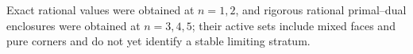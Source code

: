 Exact rational values were obtained at \(n=1,2\), and rigorous rational primal--dual enclosures were obtained at \(n=3,4,5\); their active sets include mixed faces and pure corners and do not yet identify a stable limiting stratum.